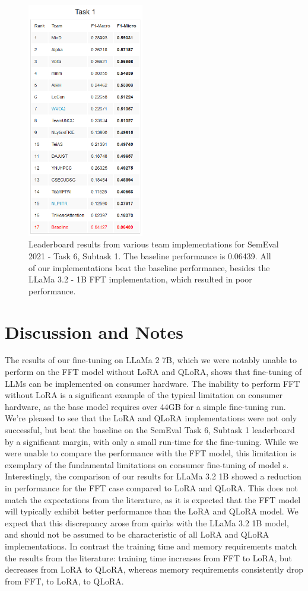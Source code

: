 \documentclass[11pt]{article}
\begin{document}
\begin{figure}[h]
	\includegraphics[width=2in]{semeval_leaderboard.png}
	\centering
	\caption{Leaderboard results from various team implementations for SemEval 2021 - Task 6, Subtask 1. The baseline performance is 0.06439. All of our implementations beat the baseline performance, besides the LLaMa 3.2 - 1B FFT implementation, which resulted in poor performance.}
	\label{fig:leaderboard}
\end{figure}

\section{Discussion and Notes}

The results of our fine-tuning on LLaMa 2 7B, which we were notably unable to perform on the FFT model without LoRA and QLoRA, shows that fine-tuning of LLMs can be implemented on consumer hardware. The inability to perform FFT without LoRA is a significant example of the typical limitation on consumer hardware, as the base model requires over 44GB for a simple fine-tuning run. We’re pleased to see that the LoRA and QLoRA implementations were not only successful, but beat the baseline on the SemEval Task 6, Subtask 1 leaderboard by a significant margin, with only a small run-time for the fine-tuning. While we were unable to compare the performance with the FFT model, this limitation is exemplary of the fundamental limitations on consumer fine-tuning of model
s. 
Interestingly, the comparison of our results for LLaMa 3.2 1B showed a reduction in performance for the FFT case compared to LoRA and QLoRA. This does not match the expectations from the literature, as it is expected that the FFT model will typically exhibit better performance than the LoRA and QLoRA model. We expect that this discrepancy arose from quirks with the LLaMa 3.2 1B model, and should not be assumed to be characteristic of all LoRA and QLoRA implementations. In contrast the training time and memory requirements match the results from the literature: training time increases from FFT to LoRA, but decreases from LoRA to QLoRA, whereas memory requirements consistently drop from FFT, to LoRA, to QLoRA. 
\end{document}
